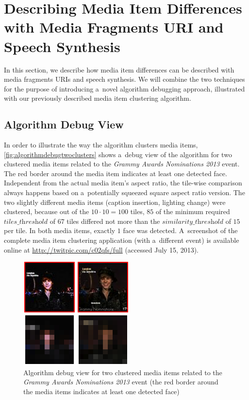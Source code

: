 \section[Describing Media Item Differences with Media Fragments URI]{Describing Media Item Differences with Media Fragments URI and Speech Synthesis}

In this section, we describe how media item differences
can be described with media fragments URIs and speech synthesis.
We will combine the two techniques for the purpose of
introducing a~novel algorithm debugging approach,
illustrated with our previously described
media item clustering algorithm.

\subsection{Algorithm Debug View}
\label{sec:algorithm-debug-view}

In order to illustrate the way the algorithm clusters media items,
\autoref{fig:algorithmdebugtwoclusters} shows a~debug view of the algorithm
for two clustered media items related to the
\emph{Grammy Awards Nominations 2013} event.
The red border around the media item indicates at least one detected face.
Independent from the actual media item's aspect ratio,
the tile-wise comparison always happens based on a~potentially squeezed
square aspect ratio version.
The two slightly different media items (caption insertion, lighting change)
were clustered, because out of the $10 \cdot 10 = 100$ tiles,
$85$ of the minimum required $\textit{tiles\_threshold}$ of $67$ tiles differed not more
than the $\textit{similarity\_threshold}$ of $15$ per tile.
In both media items, exactly $1$ face was detected.
A~screenshot of the complete media item clustering application (with a~different event)
is available online at \url{http://twitpic.com/c02qfs/full} (accessed July 15, 2013).

\begin{figure}[!ht]
  \centering
  \includegraphics[width=0.5\linewidth]{./algorithmdebug.png}
  \caption[Algorithm debug view for two clustered media items]
  {Algorithm debug view for two clustered media items
  related to the \emph{Grammy Awards Nominations 2013} event
  (the red border around the media items indicates at least one detected face)}
  \label{fig:algorithmdebugtwoclusters}
\end{figure}

